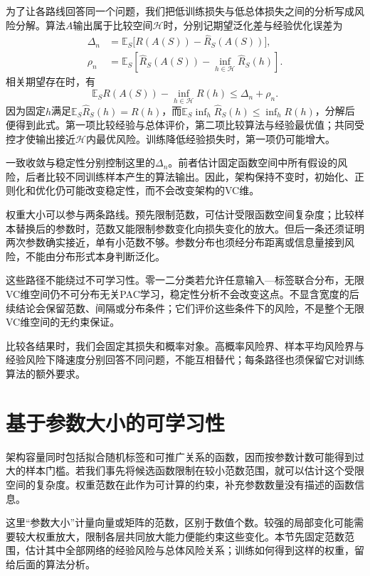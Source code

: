 为了让各路线回答同一个问题，我们把低训练损失与低总体损失之间的分析写成风险分解。算法$A$输出属于比较空间$\mathcal H$时，分别记期望泛化差与经验优化误差为
\[
 \begin{aligned}
 \Delta_n&=\mathbb E_S\bigl[R(A(S))-\hat R_S(A(S))\bigr],\\
 \rho_n&=\mathbb E_S\left[\hat R_S(A(S))-
                         \inf_{h\in\mathcal H}\hat R_S(h)\right].
 \end{aligned}
\]
相关期望存在时，有
\begin{equation}
 \mathbb E_S R(A(S))-\inf_{h\in\mathcal H}R(h)
 \leq\Delta_n+\rho_n.
 \label{eq:deep-risk-decomposition}
\end{equation}
因为固定$h$满足$\mathbb E_S\hat R_S(h)=R(h)$，而$\mathbb E_S\inf_h\hat R_S(h)\leq\inf_h R(h)$，分解后便得到此式。第一项比较经验与总体评价，第二项比较算法与经验最优值；共同受控才使输出接近$\mathcal H$内最优风险。训练降低经验损失时，第一项仍可能增大。

一致收敛与稳定性分别控制这里的$\Delta_n$。前者估计固定函数空间中所有假设的风险，后者比较不同训练样本产生的算法输出。因此，架构保持不变时，初始化、正则化和优化仍可能改变稳定性，而不会改变架构的VC维。

权重大小可以参与两条路线。预先限制范数，可估计受限函数空间复杂度；比较样本替换后的参数时，范数又能限制参数变化向损失变化的放大。但后一条还须证明两次参数确实接近，单有小范数不够。参数分布也须经分布距离或信息量接到风险，不能由分布形式本身判断泛化。

这些路径不能绕过不可学习性。零一二分类若允许任意输入—标签联合分布，无限VC维空间仍不可分布无关PAC学习，稳定性分析不会改变这点。不显含宽度的后续结论会保留范数、间隔或分布条件；它们评价这些条件下的风险，不是整个无限VC维空间的无约束保证。

比较各结果时，我们会固定其损失和概率对象。高概率风险界、样本平均风险界与经验风险下降速度分别回答不同问题，不能互相替代；每条路径也须保留它对训练算法的额外要求。

\section{基于参数大小的可学习性}
\label{sec:network-norm-bounds}

架构容量同时包括拟合随机标签和可推广关系的函数，因而按参数计数可能得到过大的样本门槛。若我们事先将候选函数限制在较小范数范围，就可以估计这个受限空间的复杂度。权重范数在此作为可计算的约束，补充参数数量没有描述的函数信息。

这里“参数大小”计量向量或矩阵的范数，区别于数值个数。较强的局部变化可能需要较大权重放大，限制各层共同放大能力便能约束这些变化。本节先固定范数范围，估计其中全部网络的经验风险与总体风险关系；训练如何得到这样的权重，留给后面的算法分析。

